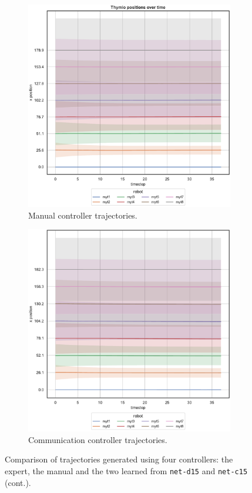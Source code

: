 \medskip
\begin{figure}[!htb]\ContinuedFloat
	\begin{center}
		\begin{subfigure}[h]{0.49\textwidth}
			\centering			
			\includegraphics[width=.9\textwidth]{contents/images/net-d15/position-overtime-manual}%
			\caption{Manual controller trajectories.}
		\end{subfigure}
		\hfill
		\begin{subfigure}[h]{0.49\textwidth}
			\centering
			\includegraphics[width=.9\textwidth]{contents/images/net-c15/position-overtime-learned_communication}
			\caption{Communication controller trajectories.}
		\end{subfigure}
	\end{center}
	\vspace{-0.5cm}
	\caption[]{Comparison of trajectories generated using four controllers: the 
		expert, the manual and the two learned from \texttt{net-d15} and 
		\texttt{net-c15} (cont.).}
	\label{fig:net-c15traj}
\end{figure}
